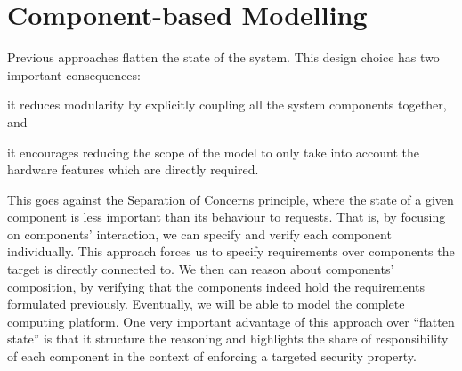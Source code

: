 \section{Component-based Modelling} %
\label{sec:related:interface}

Previous approaches flatten the state of the system.
%
This design choice has two important consequences:
%
\begin{inparaenum}[(1)]
%
\item it reduces modularity by explicitly coupling all the system components
  together, and
%
\item it encourages reducing the scope of the model to only take into account
  the hardware features which are directly required.
%
\end{inparaenum}
%
This goes against the Separation of Concerns principle, where the state of a
given component is less important than its behaviour to requests.
%
That is, by focusing on components' interaction, we can specify and verify each
component individually.
%
This approach forces us to specify requirements over components the target is directly
connected to.
%
We then can reason about components’ composition, by verifying that the
components indeed hold the requirements formulated previously.
%
Eventually, we will be able to model the complete computing platform.
%
One very important advantage of this approach over ``flatten state'' is that it
structure the reasoning and highlights the share of responsibility of each
component in the context of enforcing a targeted security property.


